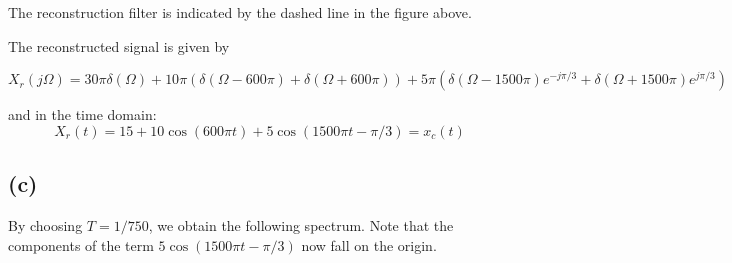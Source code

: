 \documentclass{article}
\begin{document}
The reconstruction filter is indicated by the dashed line in the figure above.

The reconstructed signal is given by

\begin{equation}
X_r(j\Omega) = 30\pi\delta(\Omega) + 10\pi(\delta(\Omega-600\pi) + \delta(\Omega+600\pi)) + 5\pi(\delta(\Omega-1500\pi)e^{-j\pi/3} + \delta(\Omega+1500\pi)e^{j\pi/3})
\end{equation}

\noindent and in the time domain:
\begin{equation}
X_r(t) = 15 + 10\cos(600\pi t) + 5\cos(1500\pi t - \pi/3) = x_c(t) \tag{exactly equal to the original signal}
\end{equation}

\subsection{(c)}

By choosing $T = 1/750$, we obtain the following spectrum. Note that the components of the term $5\cos(1500\pi t-\pi/3)$ now fall on the origin. 
\end{document}
